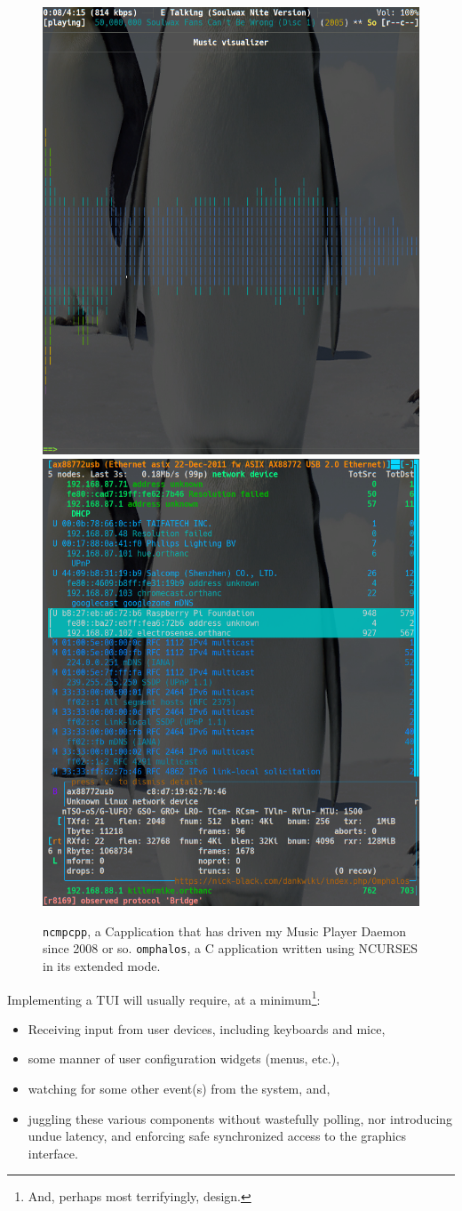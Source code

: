 \documentclass[letterpaper,10pt]{article}
\newenvironment{denseitemize}{
  \begin{itemize}
      \setlength{\itemsep}{0pt}
}{
  \end{itemize}
}
\newcommand\CC{C\nolinebreak\hspace{-.05em}\raisebox{.4ex}{\relsize{-3}{\textbf{+}}}\nolinebreak\hspace{-.10em}\raisebox{.4ex}{\relsize{-3}{\textbf{+}}}\hspace{.2em}}
\begin{document}
\begin{figure}[!htbp]
\end{figure}

\begin{figure}[!htbp]
  \centering
    \includegraphics[width=.4\linewidth]{media/tui-ncmpcpp.png}
    \hfill
    \includegraphics[width=.4\linewidth]{media/tui-omphalos.png}
    \caption[NCURSES TUIs: Ncmpcpp and Omphalos.]
    {\texttt{ncmpcpp}, a \CC application
      that has driven my Music Player Daemon since 2008 or so.
      \texttt{omphalos}, a C application
      written using NCURSES in its extended mode.}
  \label{fig:ncurses-tuis}
\end{figure}

Implementing a TUI will usually require, at a minimum\footnote{And, perhaps
  most terrifyingly, design.}:
\begin{denseitemize}
\item{Receiving input from user devices, including keyboards and mice,}
\item{some manner of user configuration widgets (menus, etc.),}
\item{watching for some other event(s) from the system, and},
\item{juggling these various components without wastefully polling, nor
       introducing undue latency, and enforcing safe synchronized access to
       the graphics interface.}
\end{denseitemize}
\end{document}
